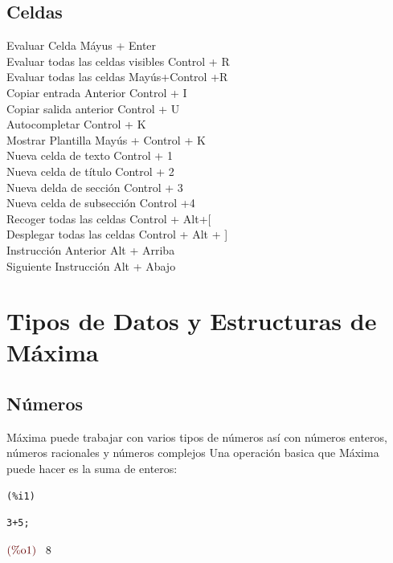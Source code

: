 \documentclass[10pt,a4paper]{book}
\begin{document}
\section{Celdas}
Evaluar Celda Máyus + Enter \\
Evaluar todas las celdas visibles Control + R\\
Evaluar todas las celdas Mayús+Control +R\\
Copiar entrada Anterior Control + I\\
Copiar salida anterior Control + U\\
Autocompletar Control + K\\
Mostrar Plantilla Mayús + Control + K\\
Nueva celda de texto Control + 1\\
Nueva celda de título Control + 2\\
Nueva delda de sección Control + 3\\
Nueva celda de subsección Control +4\\
Recoger todas las celdas Control + Alt+[ \\
Desplegar todas las celdas Control + Alt + ] \\
Instrucción Anterior Alt + Arriba \\
Siguiente Instrucción Alt + Abajo \\

\chapter{Tipos de Datos y Estructuras de Máxima}
\section{Números} 
Máxima puede trabajar con varios tipos de números así con números enteros, números racionales y números complejos
Una operación basica que Máxima puede hacer es la suma de enteros:\\

\noindent
\begin{minipage}[t]{8ex}{\color{red}\bf
\begin{verbatim}
(%i1) 
\end{verbatim}}
\end{minipage}
\begin{minipage}[t]{\textwidth}{\color{blue}
\begin{verbatim}
3+5;
\end{verbatim}}
\end{minipage}
\begin{math}\displaystyle
\parbox{8ex}{\color{labelcolor}(\%o1) }
8
\end{math}
\end{document}
